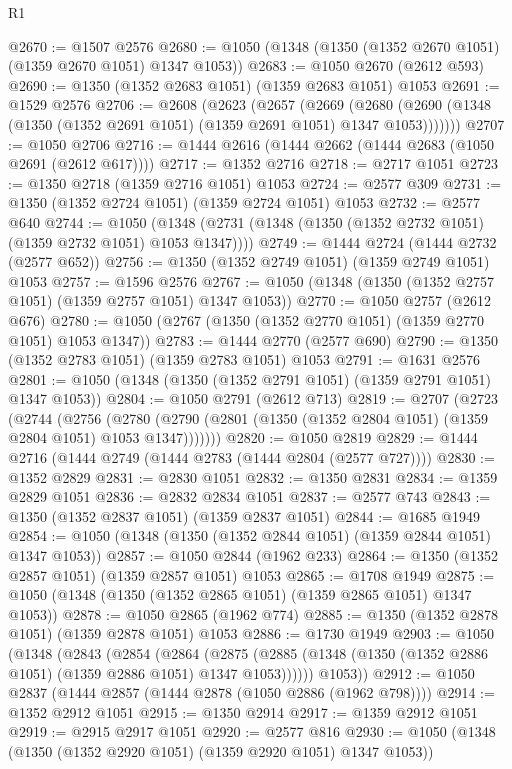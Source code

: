 \begin{lexlean}{R1}
\begin{coremodule}
@2670 := @1507 @2576
@2680 := @1050 (@1348 (@1350 (@1352 @2670 @1051) (@1359 @2670 @1051) @1347 @1053))
@2683 := @1050 @2670 (@2612 @593)
@2690 := @1350 (@1352 @2683 @1051) (@1359 @2683 @1051) @1053
@2691 := @1529 @2576
@2706 := @2608
    (@2623
      (@2657
        (@2669
          (@2680 (@2690 (@1348 (@1350 (@1352 @2691 @1051) (@1359 @2691 @1051) @1347 @1053)))))))
@2707 := @1050 @2706
@2716 := @1444 @2616 (@1444 @2662 (@1444 @2683 (@1050 @2691 (@2612 @617))))
@2717 := @1352 @2716
@2718 := @2717 @1051
@2723 := @1350 @2718 (@1359 @2716 @1051) @1053
@2724 := @2577 @309
@2731 := @1350 (@1352 @2724 @1051) (@1359 @2724 @1051) @1053
@2732 := @2577 @640
@2744 := @1050 (@1348 (@2731 (@1348 (@1350 (@1352 @2732 @1051) (@1359 @2732 @1051) @1053 @1347))))
@2749 := @1444 @2724 (@1444 @2732 (@2577 @652))
@2756 := @1350 (@1352 @2749 @1051) (@1359 @2749 @1051) @1053
@2757 := @1596 @2576
@2767 := @1050 (@1348 (@1350 (@1352 @2757 @1051) (@1359 @2757 @1051) @1347 @1053))
@2770 := @1050 @2757 (@2612 @676)
@2780 := @1050 (@2767 (@1350 (@1352 @2770 @1051) (@1359 @2770 @1051) @1053 @1347))
@2783 := @1444 @2770 (@2577 @690)
@2790 := @1350 (@1352 @2783 @1051) (@1359 @2783 @1051) @1053
@2791 := @1631 @2576
@2801 := @1050 (@1348 (@1350 (@1352 @2791 @1051) (@1359 @2791 @1051) @1347 @1053))
@2804 := @1050 @2791 (@2612 @713)
@2819 := @2707
    (@2723
      (@2744
        (@2756
          (@2780 (@2790 (@2801 (@1350 (@1352 @2804 @1051) (@1359 @2804 @1051) @1053 @1347)))))))
@2820 := @1050 @2819
@2829 := @1444 @2716 (@1444 @2749 (@1444 @2783 (@1444 @2804 (@2577 @727))))
@2830 := @1352 @2829
@2831 := @2830 @1051
@2832 := @1350 @2831
@2834 := @1359 @2829 @1051
@2836 := @2832 @2834 @1051
@2837 := @2577 @743
@2843 := @1350 (@1352 @2837 @1051) (@1359 @2837 @1051)
@2844 := @1685 @1949
@2854 := @1050 (@1348 (@1350 (@1352 @2844 @1051) (@1359 @2844 @1051) @1347 @1053))
@2857 := @1050 @2844 (@1962 @233)
@2864 := @1350 (@1352 @2857 @1051) (@1359 @2857 @1051) @1053
@2865 := @1708 @1949
@2875 := @1050 (@1348 (@1350 (@1352 @2865 @1051) (@1359 @2865 @1051) @1347 @1053))
@2878 := @1050 @2865 (@1962 @774)
@2885 := @1350 (@1352 @2878 @1051) (@1359 @2878 @1051) @1053
@2886 := @1730 @1949
@2903 := @1050
    (@1348
      (@2843
        (@2854
          (@2864
            (@2875 (@2885 (@1348 (@1350 (@1352 @2886 @1051) (@1359 @2886 @1051) @1347 @1053))))))
        @1053))
@2912 := @1050 @2837 (@1444 @2857 (@1444 @2878 (@1050 @2886 (@1962 @798))))
@2914 := @1352 @2912 @1051
@2915 := @1350 @2914
@2917 := @1359 @2912 @1051
@2919 := @2915 @2917 @1051
@2920 := @2577 @816
@2930 := @1050 (@1348 (@1350 (@1352 @2920 @1051) (@1359 @2920 @1051) @1347 @1053))

\end{coremodule}
\end{lexlean}
